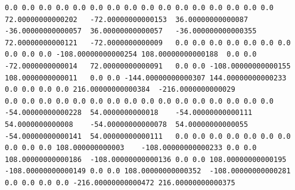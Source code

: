 \documentclass[12pt]{report} %
\begin{document}
\begin{landscape}
\begin{lstlisting}[numbers=none, basicstyle=\ttfamily\tiny, captionpos=b, caption={Matriz de coeficientes $W = G^{-1}$ ($54\times54$) calculada con Julia, sin redondear.}, label=cod:W-julia]
0.0	0.0	0.0	0.0	0.0	0.0	0.0	0.0	0.0	0.0	0.0	0.0	0.0	0.0	0.0	0.0	72.00000000000202	-72.00000000000153	36.00000000000087	-36.00000000000057	36.00000000000057	-36.000000000000355	72.00000000000121	-72.0000000000009	0.0	0.0	0.0	0.0	0.0	0.0	0.0	0.0	0.0	0.0	-108.00000000000254	108.00000000000188	0.0	0.0	-72.0000000000014	72.00000000000091	0.0	0.0	-108.00000000000155	108.0000000000011	0.0	0.0	-144.00000000000307	144.00000000000233	0.0	0.0	0.0	0.0	216.00000000000384	-216.0000000000029
0.0	0.0	0.0	0.0	0.0	0.0	0.0	0.0	0.0	0.0	0.0	0.0	0.0	0.0	0.0	0.0	-54.00000000000228	54.0000000000018	-54.00000000000111	54.0000000000008	-54.00000000000078	54.00000000000055	-54.00000000000141	54.00000000000111	0.0	0.0	0.0	0.0	0.0	0.0	0.0	0.0	0.0	0.0	108.000000000003	-108.00000000000233	0.0	0.0	108.00000000000186	-108.00000000000136	0.0	0.0	108.00000000000195	-108.00000000000149	0.0	0.0	108.00000000000352	-108.00000000000281	0.0	0.0	0.0	0.0	-216.00000000000472	216.00000000000375
\end{lstlisting}


\end{landscape}
\end{document}
